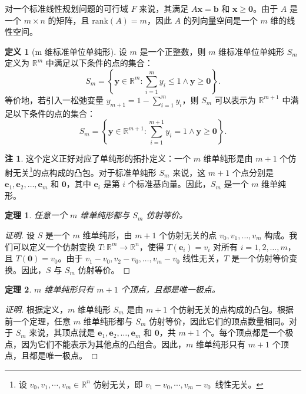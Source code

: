 \documentclass[12pt]{article}
\theoremstyle{plain}
\newtheorem{thm}{定理}[subsection]
\theoremstyle{definition}
\newtheorem{dfn}{定义}[subsection]
\newtheorem{rmk}{注}[subsection]
\newenvironment{prf}[1][证明]{\begin{proof}[#1]}{\end{proof}}
\newcommand{\R}{\mathbb{R}}
\newcommand{\rank}{\mathrm{rank}}
\begin{document}
对一个标准线性规划问题的可行域 $F$ 来说，其满足 $A\bm{x} = \bm{b}$ 和 $\bm{x} \geq \bm{0}$。由于 $A$ 是一个 $m \times n$ 的矩阵，且 $\rank(A) = m$，因此 $A$ 的列向量空间是一个 $m$ 维的线性空间。
\begin{dfn}[m 维标准单位单纯形]
    设 $m$ 是一个正整数，则 $m$ 维标准单位单纯形 $S_m$ 定义为 $\R^m$ 中满足以下条件的点的集合：
    \[ S_m = \left\{\bm{y} \in \R^m : \sum_{i=1}^m y_i \leq 1 \land \bm{y} \geq \bm{0}\right\}. \]
    等价地，若引入一松弛变量 $\displaystyle y_{m+1} = 1 - \sum_{i=1}^m y_i$，则 $S_m$ 可以表示为 $\R^{m+1}$ 中满足以下条件的点的集合：
    \[ S_m = \left\{\bm{y} \in \R^{m+1} : \sum_{i=1}^{m+1} y_i = 1 \land \bm{y} \geq \bm{0}\right\}. \]
\end{dfn}
\begin{rmk}
    这个定义正好对应了单纯形的拓扑定义：一个 $m$ 维单纯形是由 $m+1$ 个仿射无关\footnote{设 $v_0, v_1, \cdots, v_m \in \R^n$ 仿射无关，即 $v_1 − v_0, \cdots, v_m − v_0$ 线性无关。}的点构成的凸包。对于标准单纯形 $S_m$ 来说，这 $m+1$ 个点分别是 $\bm{e}_1, \bm{e}_2, \ldots, \bm{e}_m$ 和 $\bm{0}$，其中 $\bm{e}_i$ 是第 $i$ 个标准基向量。因此，$S_m$ 是一个 $m$ 维单纯形。
\end{rmk}

\begin{thm}
    任意一个 $m$ 维单纯形都与 $S_m$ 仿射等价。
\end{thm}
\begin{prf}
    设 $S$ 是一个 $m$ 维单纯形，由 $m+1$ 个仿射无关的点 $v_0, v_1, \ldots, v_m$ 构成。我们可以定义一个仿射变换 $T: \R^m \to \R^n$，使得 $T(\bm{e}_i) = v_i$ 对所有 $i=1,2,\ldots,m$，且 $T(\bm{0}) = v_0$。由于 $v_1 - v_0, v_2 - v_0, \ldots, v_m - v_0$ 线性无关，$T$ 是一个仿射等价变换。因此，$S$ 与 $S_m$ 仿射等价。
\end{prf}

\begin{thm}
    $m$ 维单纯形只有 $m+1$ 个顶点，且都是唯一极点。
\end{thm}
\begin{prf}
    根据定义，$m$ 维单纯形 $S_m$ 是由 $m+1$ 个仿射无关的点构成的凸包。根据前一个定理，任意 $m$ 维单纯形都与 $S_m$ 仿射等价，因此它们的顶点数量相同。对于 $S_m$ 来说，其顶点就是 $\bm{e}_1, \bm{e}_2, \ldots, \bm{e}_m$ 和 $\bm{0}$，共 $m+1$ 个。每个顶点都是一个极点，因为它们不能表示为其他点的凸组合。因此，$m$ 维单纯形只有 $m+1$ 个顶点，且都是唯一极点。
\end{prf}
\end{document}
